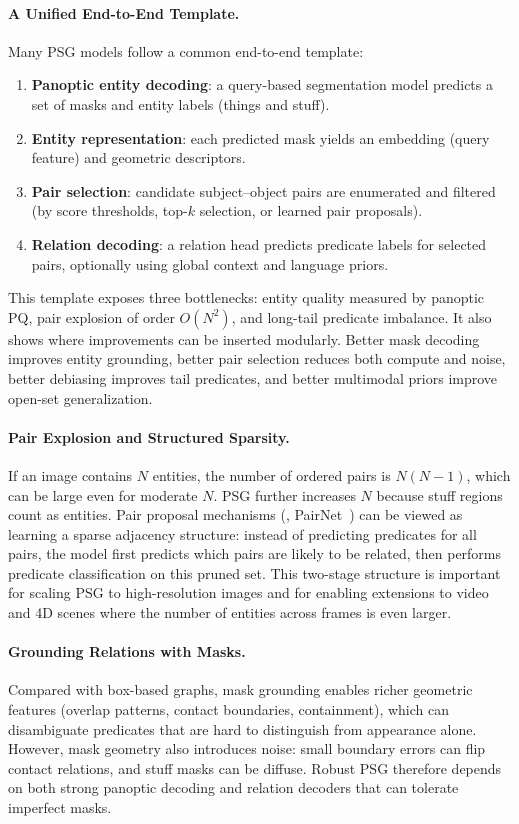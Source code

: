 \paragraph{A Unified End-to-End Template.}
Many PSG models follow a common end-to-end template:
\begin{enumerate}
    \item \textbf{Panoptic entity decoding}: a query-based segmentation model predicts a set of masks and entity labels (things and stuff).
    \item \textbf{Entity representation}: each predicted mask yields an embedding (query feature) and geometric descriptors.
    \item \textbf{Pair selection}: candidate subject--object pairs are enumerated and filtered (by score thresholds, top-$k$ selection, or learned pair proposals).
    \item \textbf{Relation decoding}: a relation head predicts predicate labels for selected pairs, optionally using global context and language priors.
\end{enumerate}
This template exposes three bottlenecks: entity quality measured by panoptic PQ, pair explosion of order $O(N^2)$, and long-tail predicate imbalance. It also shows where improvements can be inserted modularly. Better mask decoding improves entity grounding, better pair selection reduces both compute and noise, better debiasing improves tail predicates, and better multimodal priors improve open-set generalization.

\paragraph{Pair Explosion and Structured Sparsity.}
If an image contains $N$ entities, the number of ordered pairs is $N(N-1)$, which can be large even for moderate $N$. PSG further increases $N$ because stuff regions count as entities. Pair proposal mechanisms (\eg, PairNet~\citep{wang2023pair}) can be viewed as learning a sparse adjacency structure: instead of predicting predicates for all pairs, the model first predicts which pairs are likely to be related, then performs predicate classification on this pruned set. This two-stage structure is important for scaling PSG to high-resolution images and for enabling extensions to video and 4D scenes where the number of entities across frames is even larger.

\paragraph{Grounding Relations with Masks.}
Compared with box-based graphs, mask grounding enables richer geometric features (overlap patterns, contact boundaries, containment), which can disambiguate predicates that are hard to distinguish from appearance alone. However, mask geometry also introduces noise: small boundary errors can flip contact relations, and stuff masks can be diffuse. Robust PSG therefore depends on both strong panoptic decoding and relation decoders that can tolerate imperfect masks.


